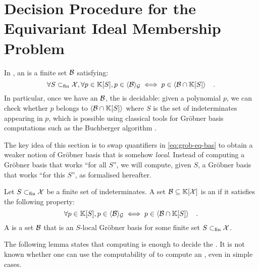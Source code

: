 \section{Decision Procedure for the Equivariant Ideal Membership Problem}
\label{sec:algorithm}


In \cite{GHOLAS24}, an  
is a finite set $\Basis$
satisfying:
\begin{equation}
    \label{eq:grob-eq-bas}
    \forall S \subfin \X, 
    \forall p \in \poly{\K}{S},
    p \in \gen{\Basis}{\group}
    \iff
    p \in \gen{\Basis \cap \poly{\K}{S}}
        \quad .
\end{equation}
In particular, once we have an  $\Basis$,
the  is decidable: given a polynomial
$p$, we can check whether $p$ belongs to $\gen{\Basis \cap \poly{\K}{S}}{}$
where $S$ is the set of indeterminates appearing in $p$, which is possible
using classical tools for Gröbner basis computations such as 
the Buchberger algorithm \cite{BUCH76}.

The key idea of this section is to swap quantifiers in \cref{eq:grob-eq-bas}
to obtain a weaker notion of Gröbner basis that is somehow
\emph{local}.  Instead of computing a Gröbner basis that works
``for all $S$'', we will compute, given $S$, a
Gröbner basis that works ``for this $S$'', as formalised hereafter.
\begin{definition}
    \label{def:weak-grob}
    Let $S \subset_{\text{fin}} \mathcal{X}$ be a finite set of indeterminates.
    A set $\Basis \subseteq \poly{\K}{\X}$ is an 
    if it satisfies the following property:
    \begin{equation}
        \label{eq:weak-grob}
        \forall p \in \poly{\K}{S},
        p \in \gen{\Basis}{\group}
        \iff
        p \in \gen{\Basis \cap \poly{\K}{S}}
        \quad .
    \end{equation}
    A  
    is a set $\Basis$ that is an $S$-local Gröbner basis
    for some finite set $S \subset_{\text{fin}} \mathcal{X}$.
\end{definition}

The following lemma states that computing  is enough to
decide the . It is not known whether
one can use the computability of  to compute an
, even in simple cases.


